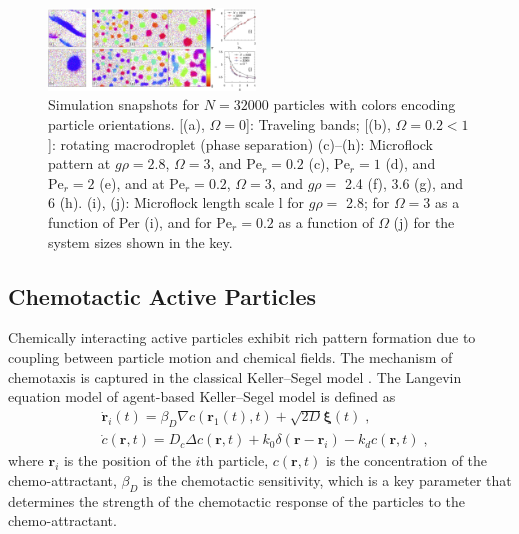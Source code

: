 \documentclass[a4paper, amsfonts, amssymb, amsmath, reprint, showkeys, showpacs, nofootinbib, twoside]{revtex4-2}
\begin{document}
\begin{figure}
    \includegraphics[width=0.49\textwidth]{./figs/2017Lieb.png}
    \caption{
        \label{fig:2017Lieb}
        Simulation snapshots for $N = 32000$ particles with colors encoding particle orientations. [(a), $\Omega = 0$]: Traveling bands;
        [(b), $\Omega = 0.2 < 1$]: rotating macrodroplet (phase separation) (c)–(h): Microflock pattern at $g\rho=2.8$, $\Omega=3$, and $\text{Pe}_r=0.2$ (c), $\text{Pe}_r=1$ (d), and $\text{Pe}_r=2$ (e), and at $\text{Pe}_r=0.2$, $\Omega=3$, and $g\rho=$ 2.4 (f), 3.6 (g), and 6 (h). (i), (j): Microflock length scale l for
        $g\rho=$ 2.8; for $\Omega=3$ as a function of Per (i), and for $\text{Pe}_r=0.2$ as a function of $\Omega$ (j) for the system sizes shown in the key.
    }
\end{figure}

\subsection{Chemotactic Active Particles}

Chemically interacting active particles exhibit rich pattern formation due to coupling between particle motion and chemical fields. The mechanism of chemotaxis is captured in the classical Keller--Segel model \cite{keller_initiation_1970,keller_model_1971}. The Langevin equation model of agent-based Keller--Segel model is defined as
\begin{subequations}
    \label{eq:agentsChemotaxis}
    \begin{align}
        &\dot{\mathbf{r}}_i(t)=\beta_D\nabla c(\mathbf{r}_1(t),t)+\sqrt{2D}\boldsymbol{\xi }(t)\;,\\
        &\dot{c}(\mathbf{r},t)=D_c\Delta c(\mathbf{r},t)+k_0\delta (\mathbf{r}-\mathbf{r}_i)-k_dc(\mathbf{r},t)\;,
    \end{align}
\end{subequations}
where $\mathbf{r}_i$ is the position of the $i$th particle, $c(\mathbf{r},t)$ is the concentration of the chemo-attractant, $\beta_D$ is the chemotactic sensitivity, which is a key parameter that determines the strength of the chemotactic response of the particles to the chemo-attractant.
\end{document}
